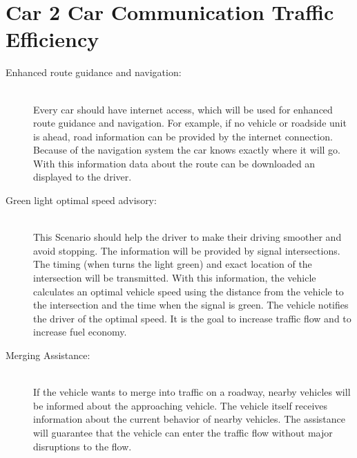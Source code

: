 \section{Car 2 Car Communication Traffic Efficiency}
\label{sec:C2CTarfficEfficiency}
\begin{description}
  \item[Enhanced route guidance and navigation:] \hfill \\ Every car should have internet access, which will be used for enhanced route guidance and navigation. For example, if no vehicle or roadside unit is ahead, road information can be provided by the internet connection. Because of the navigation system the car knows exactly where it will go. With this information data about the route can be downloaded an displayed to the driver. 
  \item[Green light optimal speed advisory:] \hfill \\ This Scenario should help the driver to make their driving smoother and avoid stopping. The information will be provided by signal intersections. The timing (when turns the light green) and exact location of the intersection will be transmitted. With this information, the vehicle calculates an optimal vehicle speed using the distance from the vehicle to the intersection and the time when the signal is green. The vehicle notifies the driver of the optimal speed. It is the goal to increase traffic flow and to increase fuel economy. 
  \item[Merging Assistance:] \hfill \\ If the vehicle wants to merge into traffic on a roadway, nearby vehicles will be informed about the approaching vehicle. The vehicle itself receives information about the current behavior of nearby vehicles. The assistance will guarantee that the vehicle can enter the traffic flow without major disruptions to the flow. 
\end{description}	

